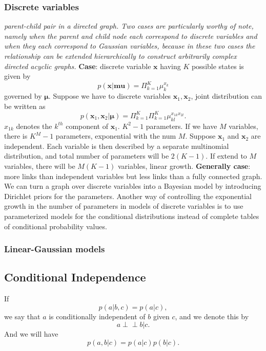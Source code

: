\documentclass[a4paper]{book}
\def\ci{\perp\!\!\!\perp}
\renewcommand{\bf}{\mathbf}
\begin{document}
\subsubsection{Discrete variables}
\textit{parent-child pair in a directed graph. Two cases are particularly worthy of note, namely when the parent and child node each correspond to discrete variables and when they each correspond to Gaussian variables, because in these two cases the relationship can be extended hierarchically to construct arbitrarily complex directed acyclic graphs.}
\newline
\textbf{Case}:  discrete variable $\textbf{x}$ having $K$ possible states is given by
\begin{equation}\label{eq8.5}
  p(\bf{x}|\bf{mu}) =  \Pi_{k=1}^K\mu_k^{x_k}
\end{equation} governed by $\bf{\mu}$.
Suppose we have to discrete variables $\bf x_1, \bf x_2$, joint distribution can be written as
\begin{equation}\label{eq8.6}
  p(\bf x_1, \bf x_2|\bf{\mu})=\Pi_{k=1}^K\Pi_{k=1}^K\mu_{kl}^{x_{1k}x_{2l}}.
\end{equation}
$x_{1k}$ denotes the $k^{th}$ component of $\bf x_1$.
\newline
$K^2-1$ parameters. If we have $M$ variables, there is $K^M-1$ parameters, exponential with the num $M$.
\newline
Suppose $\bf x_1$ and $\bf x_2$ are independent. Each variable is then described by a separate multinomial distribution, and total number of parameters will be $2(K-1)$. If extend to $M$ variables, there will be $M(K-1)$ variables, linear growth.
\newline
\textbf{Generally case}: more links than independent variables but less links than a fully connected graph.
\newline
We can turn a graph over discrete variables into a Bayesian model by introducing Dirichlet priors for the parameters.
\newline
Another way of controlling the exponential growth in the number of parameters
in models of discrete variables is to use parameterized models for the conditional
distributions instead of complete tables of conditional probability values.
\subsubsection{Linear-Gaussian models}

\subsection{Conditional Independence}
If
\begin{equation}\label{eq8.7}
  p(a|b, c) = p(a|c),
\end{equation}
we say that $a$ is conditionally independent of $b$ given $c$, and we denote this by $$a\ci b|c .$$  And we will have
\begin{equation}\label{eq8.8}
  p(a,b|c) = p(a|c)p(b|c).
\end{equation}
\end{document}
